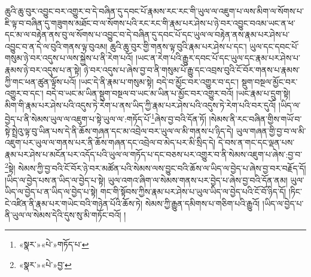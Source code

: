 ཆུའི་ཆུ་བུར་འབྱུང་བར་འགྱུར་བ་དེ་བཞིན་དུ་དབང་པོ་རྣམས་རང་རང་གི་ཡུལ་ལ་འཇུག་པ་ལས་མིག་ལ་སོགས་པ་ཇི་ལྟ་བ་བཞིན་དུ་གཟུགས་མཐོང་བ་ལ་སོགས་པའི་རང་རང་གི་རྣམ་པར་ཤེས་པ་ཉེ་བར་འབྱུང་བའམ་ཡང་ན་ཕ་དང་མ་ལ་བརྟེན་ནས་བུ་ལ་སོགས་པ་འབྱུང་བ་དེ་བཞིན་དུ་དབང་པོ་དང་ཡུལ་ལ་བརྟེན་ནས་རྣམ་པར་ཤེས་པ་འབྱུང་བ་ན་དེ་ལ་བུའི་གནས་ལྟ་བུའམ། ཆུའི་ཆུ་བུར་གྱི་གནས་ལྟ་བུའི་རྣམ་པར་ཤེས་པ་དང་། ཡུལ་དང་དབང་པོ་གསུམ་ཉེ་བར་འདུས་པ་ལས་སྐྱེས་པ་ནི་རེག་པའོ། །ཡང་ན་རེག་པའི་རྒྱུར་དབང་པོ་དང་ཡུལ་དང་རྣམ་པར་ཤེས་པ་རྣམས་ཉེ་བར་འདུས་པ་ན་སྟེ། ཉེ་བར་འདུས་པ་ཞེས་བྱ་བ་ནི་གསུམ་པོ་རྒྱུ་དང་འབྲས་བུའི་ངོ་བོར་གནས་པ་རྣམས་ཀྱི་གང་ཕན་ཚུན་ལྟོས་པའོ། །ཡང་དེ་ནི་རྣམ་པ་གསུམ་སྟེ། བདེ་བ་མྱོང་བར་འགྱུར་བ་དང་། སྡུག་བསྔལ་མྱོང་བར་འགྱུར་བ་དང་། བདེ་བ་ཡང་མ་ཡིན་སྡུག་བསྔལ་བ་ཡང་མ་ཡིན་པ་མྱོང་བར་འགྱུར་བའོ། །ཡང་རྣམ་པ་དྲུག་སྟེ། མིག་གི་རྣམ་པར་ཤེས་པའི་འདུས་ཏེ་རེག་པ་ནས་ཡིད་ཀྱི་རྣམ་པར་ཤེས་པའི་འདུས་ཏེ་རེག་པའི་བར་དུའོ། །ཡིད་ལ་བྱེད་པ་ནི་སེམས་ཡུལ་ལ་འཇུག་པ་སྟེ་ཡུལ་ལ་:གཏོད་པོ་\footnote{«སྣར་»«པེ་»གཏོད་པ་}ཞེས་བྱ་བའི་དོན་ཏོ། །སེམས་ནི་རང་བཞིན་གྱིས་གཡོ་བ་སྟེ་སྤྲེའུ་ལྟ་བུ་ཡིན་པས་དེ་ནི་ཆོས་གཞན་དང་མ་འབྲེལ་བར་ཡུལ་ལ་མི་གནས་པ་ཉིད་དེ། ཡུལ་གཞན་གྱི་བྱ་བ་ལ་མི་འཇུག་པར་ཡུལ་ལ་གནས་པར་ནི་ཆོས་གཞན་དང་འབྲེལ་བ་མེད་པར་མི་སྲིད་དེ། དེ་བས་ན་གང་དང་ལྡན་པས་རྣམ་པར་ཤེས་པ་མངོན་པར་འདོད་པའི་ཡུལ་ལ་གཏོད་པ་དང་བཅས་པར་འགྱུར་བ་ནི་སེམས་འཇུག་པ་ཞེས་:བྱ་བ་\footnote{«སྣར་»«པེ་»བྱ་}སྟེ། སེམས་ཀྱི་བྱ་བའི་ངོ་བོར་ཉེ་བར་མཚོན་པའི་སེམས་ལས་བྱུང་བའི་ཆོས་ལ་ཡིད་ལ་བྱེད་པ་ཞེས་བྱ་བར་བརྗོད་དོ། །ཡིད་ལ་བྱེད་པས་ན་ཡིད་ལ་བྱེད་པ་སྟེ། ཡུལ་འགའ་ཞིག་ལ་སེམས་གནས་པར་བྱེད་པ་ཞེས་བྱ་བའི་དོན་ནམ། ཡུལ་ཡིད་ལ་བྱེད་པ་ན་ཡིད་ལ་བྱེད་པ་སྟེ། གང་གི་སྟོབས་ཀྱིས་རྣམ་པར་ཤེས་པ་ཡུལ་ཡིད་ལ་བྱེད་པའི་ངོ་བོ་ཉིད་དོ། །ཏིང་ངེ་འཛིན་ནི་རྣམ་པར་གཡེང་བའི་གཉེན་པོའི་ཆོས་ཏེ། སེམས་ཀྱི་རྒྱུན་དམིགས་པ་གཅིག་པའི་རྒྱུའོ། །ཡིད་ལ་བྱེད་པ་ནི་ཡུལ་ལ་སེམས་དེའི་དུས་སུ་མི་གཏོང་བའོ། །
